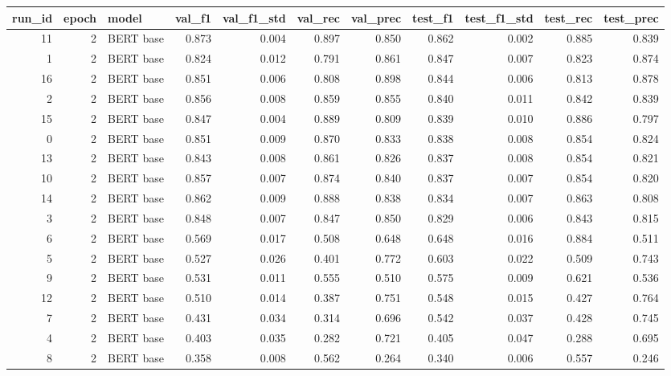\begin{tabular}{rrlrrrrrrrr}
\toprule
 run\_id &  epoch &     model &  val\_f1 &  val\_f1\_std &  val\_rec &  val\_prec &  test\_f1 &  test\_f1\_std &  test\_rec &  test\_prec \\
\midrule
     11 &      2 & BERT base &   0.873 &       0.004 &    0.897 &     0.850 &    0.862 &        0.002 &     0.885 &      0.839 \\
      1 &      2 & BERT base &   0.824 &       0.012 &    0.791 &     0.861 &    0.847 &        0.007 &     0.823 &      0.874 \\
     16 &      2 & BERT base &   0.851 &       0.006 &    0.808 &     0.898 &    0.844 &        0.006 &     0.813 &      0.878 \\
      2 &      2 & BERT base &   0.856 &       0.008 &    0.859 &     0.855 &    0.840 &        0.011 &     0.842 &      0.839 \\
     15 &      2 & BERT base &   0.847 &       0.004 &    0.889 &     0.809 &    0.839 &        0.010 &     0.886 &      0.797 \\
      0 &      2 & BERT base &   0.851 &       0.009 &    0.870 &     0.833 &    0.838 &        0.008 &     0.854 &      0.824 \\
     13 &      2 & BERT base &   0.843 &       0.008 &    0.861 &     0.826 &    0.837 &        0.008 &     0.854 &      0.821 \\
     10 &      2 & BERT base &   0.857 &       0.007 &    0.874 &     0.840 &    0.837 &        0.007 &     0.854 &      0.820 \\
     14 &      2 & BERT base &   0.862 &       0.009 &    0.888 &     0.838 &    0.834 &        0.007 &     0.863 &      0.808 \\
      3 &      2 & BERT base &   0.848 &       0.007 &    0.847 &     0.850 &    0.829 &        0.006 &     0.843 &      0.815 \\
      6 &      2 & BERT base &   0.569 &       0.017 &    0.508 &     0.648 &    0.648 &        0.016 &     0.884 &      0.511 \\
      5 &      2 & BERT base &   0.527 &       0.026 &    0.401 &     0.772 &    0.603 &        0.022 &     0.509 &      0.743 \\
      9 &      2 & BERT base &   0.531 &       0.011 &    0.555 &     0.510 &    0.575 &        0.009 &     0.621 &      0.536 \\
     12 &      2 & BERT base &   0.510 &       0.014 &    0.387 &     0.751 &    0.548 &        0.015 &     0.427 &      0.764 \\
      7 &      2 & BERT base &   0.431 &       0.034 &    0.314 &     0.696 &    0.542 &        0.037 &     0.428 &      0.745 \\
      4 &      2 & BERT base &   0.403 &       0.035 &    0.282 &     0.721 &    0.405 &        0.047 &     0.288 &      0.695 \\
      8 &      2 & BERT base &   0.358 &       0.008 &    0.562 &     0.264 &    0.340 &        0.006 &     0.557 &      0.246 \\
\bottomrule
\end{tabular}
